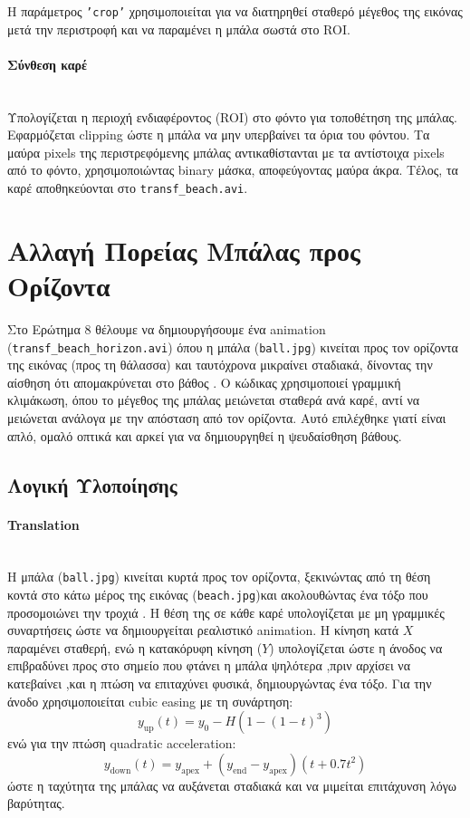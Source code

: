 \documentclass[12pt]{article}
\begin{document}
Η παράμετρος \texttt{'crop'} χρησιμοποιείται για να διατηρηθεί σταθερό μέγεθος της εικόνας μετά την περιστροφή και να παραμένει η μπάλα σωστά στο ROI.
\paragraph{Σύνθεση καρέ } 
\mbox{}\\
Υπολογίζεται η περιοχή ενδιαφέροντος (ROI) στο φόντο για τοποθέτηση της μπάλας. Εφαρμόζεται clipping ώστε η μπάλα να μην υπερβαίνει τα όρια του φόντου. Τα μαύρα pixels της περιστρεφόμενης μπάλας αντικαθίστανται με τα αντίστοιχα pixels από το φόντο, χρησιμοποιώντας binary μάσκα, αποφεύγοντας μαύρα άκρα. Τέλος, τα καρέ αποθηκεύονται στο \texttt{transf\_beach.avi}.



\section{Αλλαγή Πορείας Μπάλας προς Ορίζοντα}
Στο Ερώτημα 8 θέλουμε να δημιουργήσουμε ένα animation (\texttt{transf\_beach\_horizon.avi}) όπου η μπάλα (\texttt{ball.jpg}) κινείται προς τον ορίζοντα της εικόνας (προς τη θάλασσα) και ταυτόχρονα μικραίνει σταδιακά, δίνοντας την αίσθηση ότι απομακρύνεται στο βάθος .
Ο κώδικας χρησιμοποιεί γραμμική  κλιμάκωση, όπου το μέγεθος της μπάλας μειώνεται σταθερά ανά καρέ, αντί να μειώνεται ανάλογα με την απόσταση από τον ορίζοντα. Αυτό επιλέχθηκε γιατί είναι απλό, ομαλό οπτικά και αρκεί για να δημιουργηθεί η ψευδαίσθηση βάθους.
\subsection{Λογική Υλοποίησης}
\paragraph{Translation}
\mbox{}\\
Η μπάλα  (\texttt{ball.jpg}) κινείται κυρτά προς τον ορίζοντα, ξεκινώντας από τη θέση κοντά στο κάτω μέρος της εικόνας  (\texttt{beach.jpg})και ακολουθώντας ένα τόξο που προσομοιώνει την τροχιά . Η θέση της σε κάθε καρέ υπολογίζεται με μη γραμμικές συναρτήσεις ώστε να δημιουργείται ρεαλιστικό animation. 
Η κίνηση κατά $Χ$ παραμένει σταθερή, ενώ η κατακόρυφη κίνηση ($Y$) υπολογίζεται ώστε η άνοδος να επιβραδύνει προς στο σημείο που φτάνει η μπάλα ψηλότερα ,πριν αρχίσει να κατεβαίνει ,και η πτώση να επιταχύνει φυσικά, δημιουργώντας ένα τόξο. Για την άνοδο χρησιμοποιείται cubic easing με τη συνάρτηση:
\[
y_{\text{up}}(t) = y_0 - H \left( 1 - (1-t)^3 \right)
\]
ενώ για την πτώση quadratic acceleration:
\[
y_{\text{down}}(t) = y_{\text{apex}} + (y_{\text{end}} - y_{\text{apex}}) \left( t + 0.7 t^2 \right)
\]
ώστε η ταχύτητα της μπάλας να αυξάνεται σταδιακά και να μιμείται επιτάχυνση λόγω βαρύτητας.
\end{document}
